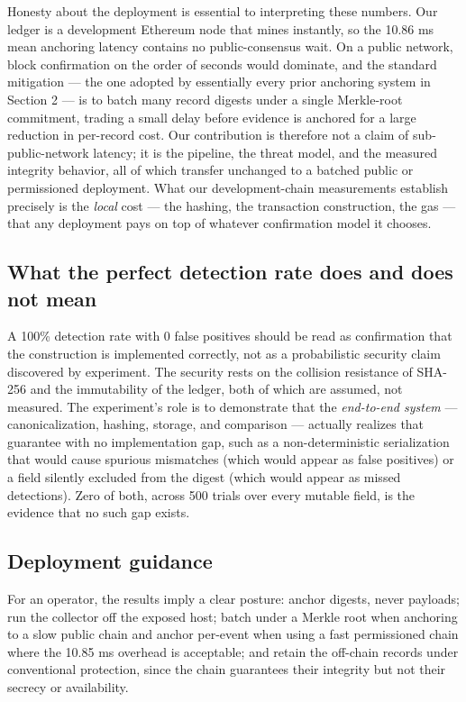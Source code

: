 \documentclass[conference]{IEEEtran}
\begin{document}
Honesty about the deployment is essential to interpreting these numbers. Our ledger is a development Ethereum node that mines instantly, so the 10.86 ms mean anchoring latency contains no public-consensus wait. On a public network, block confirmation on the order of seconds would dominate, and the standard mitigation --- the one adopted by essentially every prior anchoring system in Section 2 --- is to batch many record digests under a single Merkle-root commitment, trading a small delay before evidence is anchored for a large reduction in per-record cost. Our contribution is therefore not a claim of sub-public-network latency; it is the pipeline, the threat model, and the measured integrity behavior, all of which transfer unchanged to a batched public or permissioned deployment. What our development-chain measurements establish precisely is the \emph{local} cost --- the hashing, the transaction construction, the gas --- that any deployment pays on top of whatever confirmation model it chooses.

\subsection{What the perfect detection rate does and does not mean}

A 100\% detection rate with 0 false positives should be read as confirmation that the construction is implemented correctly, not as a probabilistic security claim discovered by experiment. The security rests on the collision resistance of SHA-256 and the immutability of the ledger, both of which are assumed, not measured. The experiment's role is to demonstrate that the \emph{end-to-end system} --- canonicalization, hashing, storage, and comparison --- actually realizes that guarantee with no implementation gap, such as a non-deterministic serialization that would cause spurious mismatches (which would appear as false positives) or a field silently excluded from the digest (which would appear as missed detections). Zero of both, across 500 trials over every mutable field, is the evidence that no such gap exists.

\subsection{Deployment guidance}

For an operator, the results imply a clear posture: anchor digests, never payloads; run the collector off the exposed host; batch under a Merkle root when anchoring to a slow public chain and anchor per-event when using a fast permissioned chain where the 10.85 ms overhead is acceptable; and retain the off-chain records under conventional protection, since the chain guarantees their integrity but not their secrecy or availability.
\end{document}
